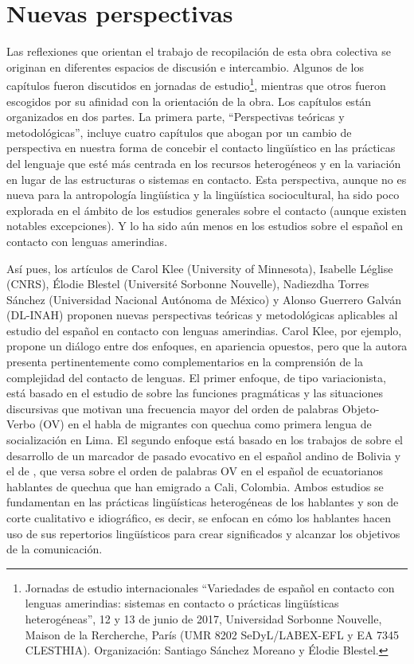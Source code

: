 \documentclass[output=paper]{langscibook}
\begin{document}
\section{Nuevas perspectivas}

Las reflexiones que orientan el trabajo de recopilación de esta obra colectiva se originan en diferentes espacios de discusión e intercambio. Algunos de los capítulos fueron discutidos en jornadas de estudio\footnote{Jornadas de estudio internacionales “Variedades de español en contacto con lenguas amerindias: sistemas en contacto o prácticas lingüísticas heterogéneas”, 12 y 13 de junio de 2017, Universidad Sorbonne Nouvelle, Maison de la Rercherche, París (UMR 8202 SeDyL/LABEX-EFL y EA 7345 CLESTHIA). Organización: Santiago Sánchez Moreano y Élodie Blestel.}, mientras que otros fueron escogidos por su afinidad con la orientación de la obra. Los capítulos están organizados en dos partes. La primera parte, “Perspectivas teóricas y metodológicas”, incluye cuatro capítulos que abogan por un cambio de perspectiva en nuestra forma de concebir el contacto lingüístico en las prácticas del lenguaje que esté más centrada en los recursos heterogéneos y en la variación en lugar de las estructuras o sistemas en contacto. Esta perspectiva, aunque no es nueva para la antropología lingüística y la lingüística sociocultural, ha sido poco explorada en el ámbito de los estudios generales sobre el contacto (aunque existen notables excepciones). Y lo ha sido aún menos en los estudios sobre el español en contacto con lenguas amerindias. 

Así pues, los artículos de Carol Klee (University of Minnesota), Isabelle Léglise (CNRS), Élodie Blestel (Université Sorbonne Nouvelle), Nadiezdha Torres Sánchez (Universidad Nacional Autónoma de México) y Alonso Guerrero Galván (DL-INAH) proponen nuevas perspectivas teóricas y metodológicas aplicables al estudio del español en contacto con lenguas amerindias. Carol Klee, por ejemplo, propone un diálogo entre dos enfoques, en apariencia opuestos, pero que la autora presenta pertinentemente como complementarios en la comprensión de la complejidad del contacto de lenguas. El primer enfoque, de tipo variacionista, está basado en el estudio de \citet{KleeEtAl2011} sobre las funciones pragmáticas y las situaciones discursivas que motivan una frecuencia mayor del orden de palabras Objeto-Verbo (OV) en el habla de migrantes con quechua como primera lengua de socialización en Lima. El segundo enfoque está basado en los trabajos de \citet{Babel2014stereotypes} sobre el desarrollo de un marcador de pasado evocativo en el español andino de Bolivia y el de  \citet{SánchezMoreano2017}, que versa sobre el orden de palabras OV en el español de ecuatorianos hablantes de quechua que han emigrado a Cali, Colombia. Ambos estudios se fundamentan en las prácticas lingüísticas heterogéneas de los hablantes y son de corte cualitativo e idiográfico, es decir, se enfocan en cómo los hablantes hacen uso de sus repertorios lingüísticos para crear significados y alcanzar los objetivos de la comunicación.
\end{document}
